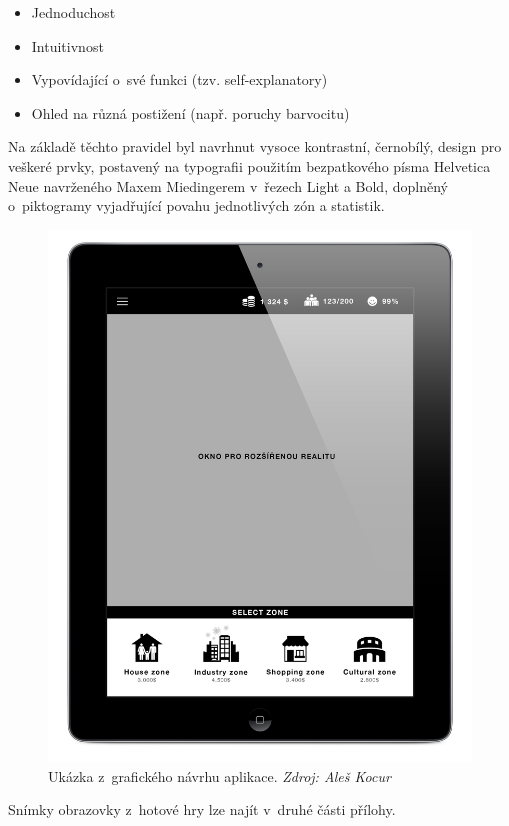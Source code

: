 \documentclass[twoside,12pt]{article}
\begin{document}
\begin{itemize}
\item Jednoduchost
\item Intuitivnost
\item Vypovídající o~své funkci (tzv. self-explanatory)
\item Ohled na různá postižení (např. poruchy barvocitu) 
\end{itemize}

Na základě těchto pravidel byl navrhnut vysoce kontrastní, černobílý, design pro veškeré prvky, postavený na typografii použitím bezpatkového písma Helvetica Neue navrženého Maxem Miedingerem v~řezech Light a Bold, doplněný o~piktogramy vyjadřující povahu jednotlivých zón a statistik.  
 
 \begin{figure}[H]
\centering
    \includegraphics[width=430px, center]{images/ipad-layout.jpg}
\captionsetup{justification=centering}
    \caption[]{Ukázka z~grafického návrhu aplikace. \textit{Zdroj: Aleš Kocur}}
    \label{class_diagram}
\end{figure}
 
 Snímky obrazovky z~hotové hry lze najít v~druhé části přílohy. 
 
 
\end{document}
